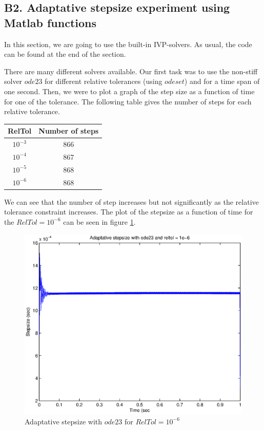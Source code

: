 

\subsection*{B2. Adaptative stepsize experiment using Matlab functions}

In this section, we are going to use the built-in IVP-solvers. As usual, the code can be found at the end of the section. 

There are many different solvers available. Our first task was to use the non-stiff solver $ode23$ for different relative tolerances (using $odeset$) and for a time span of one second. Then, we were to plot a graph of the step size as a function of time for one of the tolerance. The following table gives the number of steps for each relative tolerance.

\begin{center}
\begin{tabular}{|c|c|}
\hline 
\textbf{RelTol} & \textbf{Number of steps} \\ 
\hline 
$10^{-3}$ & 866 \\ 
\hline 
$10^{-4}$ & 867 \\ 
\hline 
$10^{-5}$ & 868 \\ 
\hline 
$10^{-6}$ & 868 \\ 
\hline 
\end{tabular} 
\end{center}

We can see that the number of step increases but not significantly as the relative tolerance constraint increases. The plot of the stepsize as a function of time for the $RelTol = 10^{-6}$ can be seen in figure \ref{step1}.

\begin{figure}
\begin{center}
\includegraphics[scale=0.5]{step1.eps}
\caption{Adaptative stepsize with $ode23$ for $RelTol = 10^{-6}$}
\label{step1}
\end{center}
\end{figure}


